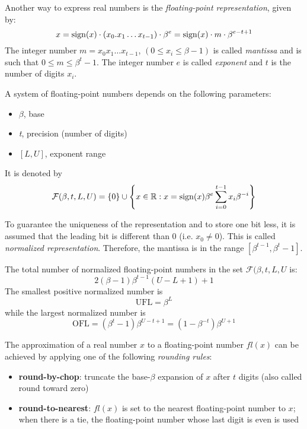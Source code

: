 Another way to express real numbers is the \textit{floating-point representation}, given by:
$$ x = \mathrm{sign}(x) \cdot (x_0.x_1 \hdots x_{t-1}) \cdot \beta^{e} = \mathrm{sign}(x) \cdot m \cdot \beta^{e-t+1} $$
The integer number $m=x_0x_1 \hdots x_{t-1}$, $(0 \leq x_i \leq \beta-1)$ is called \textit{mantissa} and is such that $0 \leq m \leq \beta^{t}-1$. The integer number $e$ is called \textit{exponent} and $t$ is the number of digits $x_i$.

A system of floating-point numbers depends on the following parameters:

\begin{itemize}
    \item $\beta$, base
    \item \textit{t}, precision (number of digits)
    \item $[L, U]$, exponent range
\end{itemize}

It is denoted by
$$ \mathcal{F}(\beta, t, L, U) = \{0\} \cup \left\{ x \in \mathbb{R} : x = \mathrm{sign}(x)\beta^{e}\sum_{i=0}^{t-1}{x_i\beta^{-i}} \right\} $$

To guarantee the uniqueness of the representation and to store one bit less, it is assumed that the leading bit is different than $0$ (i.e. $x_0 \neq 0$). This is called \textit{normalized representation}. Therefore, the mantissa is in the range $[\beta^{t-1}, \beta^{t}-1]$. 



The total number of normalized floating-point numbers in the set $\mathcal{F}(\beta, t, L, U$ is:
$$ 2(\beta -1)\beta^{t-1}(U-L+1)+1 $$
The smallest positive normalized number is
$$ \textrm{UFL} = \beta^{L} $$
while the largest normalized number is
$$ \textrm{OFL} = (\beta^{t} - 1)\beta^{U-t+1} = (1 - \beta^{-t})\beta^{U+1} $$

The approximation of a real number $x$ to a floating-point number $fl(x)$ can be achieved by applying one of the following \textit{rounding rules}:

\begin{itemize}
    \item \textbf{round-by-chop}: truncate the base-$\beta$ expansion of $x$ after $t$ digits (also called round toward zero)
    \item \textbf{round-to-nearest}: $fl(x)$ is set to the nearest floating-point number to $x$; when there is a tie, the floating-point number whose last digit is even is used
\end{itemize}


